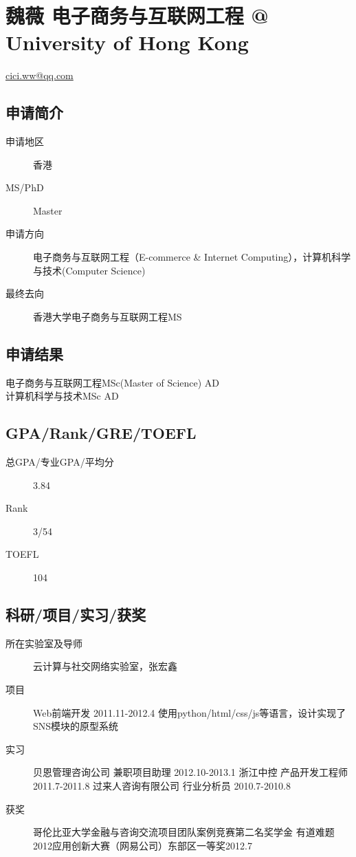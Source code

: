 \documentclass[11pt,fleqn,openany]{book} %
\begin{document}
\section{魏薇 电子商务与互联网工程 @ University of Hong Kong}
\hfill \href{mailto:cici.ww@qq.com}{cici.ww@qq.com}

\noindent\begin{minipage}[t]{0.45\textwidth}
\subsection*{申请简介}
\begin{description}
\item[申请地区] 香港
\item[MS/PhD] Master
\item[申请方向] 电子商务与互联网工程（E-commerce \& Internet Computing），计算机科学与技术(Computer Science)
\item[最终去向] 香港大学电子商务与互联网工程MS
\end{description}
\end{minipage}
\hfill
\begin{minipage}[t]{0.45\textwidth}
\subsection*{申请结果}
\noindent 电子商务与互联网工程MSc(Master of Science) AD\\
计算机科学与技术MSc AD
\end{minipage}
\subsection*{GPA/Rank/GRE/TOEFL}
\begin{description}
\item[总GPA/专业GPA/平均分] 3.84
\item[Rank] 3/54
\item[TOEFL] 104
\end{description}

\subsection*{科研/项目/实习/获奖}
\begin{description}
\item[所在实验室及导师] 云计算与社交网络实验室，张宏鑫
\item[项目] Web前端开发    2011.11-2012.4
使用python/html/css/js等语言，设计实现了SNS模块的原型系统
\item[实习] 贝恩管理咨询公司    兼职项目助理    2012.10-2013.1 
浙江中控    产品开发工程师    2011.7-2011.8 
过来人咨询有限公司    行业分析员    2010.7-2010.8
\item[获奖] 哥伦比亚大学金融与咨询交流项目团队案例竞赛第二名奖学金
有道难题2012应用创新大赛（网易公司）东部区一等奖2012.7
\end{description}
\end{document}
